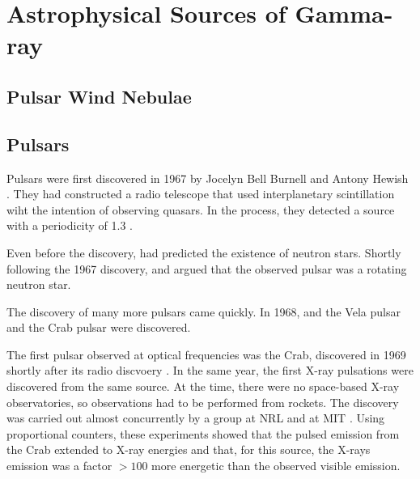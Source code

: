 \section{Astrophysical Sources of Gamma-ray}

\subsection{Pulsar Wind Nebulae}





\subsection{Pulsars}


Pulsars were first discovered in 1967 by Jocelyn Bell Burnell and Antony
Hewish \citep{hewish_1968_observation-rapidly}. They had constructed a
radio telescope that used interplanetary scintillation wiht the intention
of observing quasars.  In the process, they detected a source with a
periodicity of 1.3 \second.

Even before the discovery, \cite{pacini_1967_energy-emission} had predicted
the existence of neutron stars.  Shortly following the 1967 discovery,
\cite{gold_1968_rotating-neutron} and \cite{pacini_1968_rotating-neutron}
argued that the observed pulsar was a rotating neutron star.

The discovery of many more pulsars came quickly.  In 1968, and the
Vela pulsar \citep{large_1968_pulsar-supernova} and the Crab pulsar
\citep{staelin_1968_pulsating-radio} were discovered.

The first pulsar observed at optical frequencies was the
Crab, discovered in 1969 shortly after its radio discvoery
\citep{cocke_1969_discovery-optical}.
In the same year, the first X-ray pulsations were discovered from
the same source. At the time, there were no space-based X-ray
observatories, so observations had to be performed from rockets.
The discovery was carried out almost concurrently by a group
at \ac{NRL} \citep{fritz_1969_x-ray-pulsar} and at \ac{MIT}
\citep{bradt_1969_x-ray-optical}.  Using proportional counters,
these experiments showed that the pulsed emission from 
the Crab extended to X-ray energies and that, for this source,
the X-rays emission was a factor $>100$ more energetic than
the observed visible emission.

